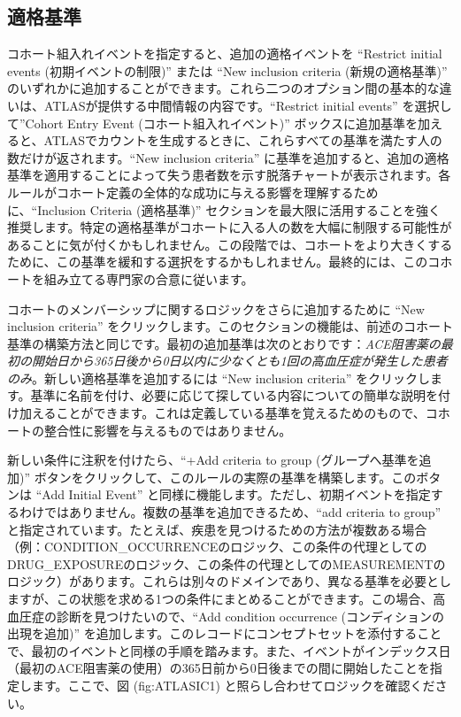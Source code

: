 \documentclass[
  11pt]{book}
\theoremstyle{definition}
\theoremstyle{definition}
\theoremstyle{definition}
\theoremstyle{definition}
\theoremstyle{remark}
\begin{document}
\subsection{適格基準}\label{ux9069ux683cux57faux6e96}

コホート組入れイベントを指定すると、追加の適格イベントを ``Restrict initial events (初期イベントの制限)'' または ``New inclusion criteria (新規の適格基準)'' のいずれかに追加することができます。これら二つのオプション間の基本的な違いは、ATLASが提供する中間情報の内容です。``Restrict initial events'' を選択して''Cohort Entry Event (コホート組入れイベント)'' ボックスに追加基準を加えると、ATLASでカウントを生成するときに、これらすべての基準を満たす人の数だけが返されます。``New inclusion criteria'' に基準を追加すると、追加の適格基準を適用することによって失う患者数を示す脱落チャートが表示されます。各ルールがコホート定義の全体的な成功に与える影響を理解するために、``Inclusion Criteria (適格基準)'' セクションを最大限に活用することを強く推奨します。特定の適格基準がコホートに入る人の数を大幅に制限する可能性があることに気が付くかもしれません。この段階では、コホートをより大きくするために、この基準を緩和する選択をするかもしれません。最終的には、このコホートを組み立てる専門家の合意に従います。

コホートのメンバーシップに関するロジックをさらに追加するために ``New inclusion criteria'' をクリックします。このセクションの機能は、前述のコホート基準の構築方法と同じです。最初の追加基準は次のとおりです：\emph{ACE阻害薬の最初の開始日から365日後から0日以内に少なくとも1回の高血圧症が発生した患者のみ}。新しい適格基準を追加するには ``New inclusion criteria'' をクリックします。基準に名前を付け、必要に応じて探している内容についての簡単な説明を付け加えることができます。これは定義している基準を覚えるためのもので、コホートの整合性に影響を与えるものではありません。

新しい条件に注釈を付けたら、``+Add criteria to group (グループへ基準を追加)'' ボタンをクリックして、このルールの実際の基準を構築します。このボタンは ``Add Initial Event'' と同様に機能します。ただし、初期イベントを指定するわけではありません。複数の基準を追加できるため、``add criteria to group'' と指定されています。たとえば、疾患を見つけるための方法が複数ある場合（例：CONDITION\_OCCURRENCEのロジック、この条件の代理としてのDRUG\_EXPOSUREのロジック、この条件の代理としてのMEASUREMENTのロジック）があります。これらは別々のドメインであり、異なる基準を必要としますが、この状態を求める1つの条件にまとめることができます。この場合、高血圧症の診断を見つけたいので、``Add condition occurrence (コンディションの出現を追加)'' を追加します。このレコードにコンセプトセットを添付することで、最初のイベントと同様の手順を踏みます。また、イベントがインデックス日（最初のACE阻害薬の使用）の365日前から0日後までの間に開始したことを指定します。ここで、図 \citet{ref}(fig:ATLASIC1) と照らし合わせてロジックを確認ください。
\end{document}
